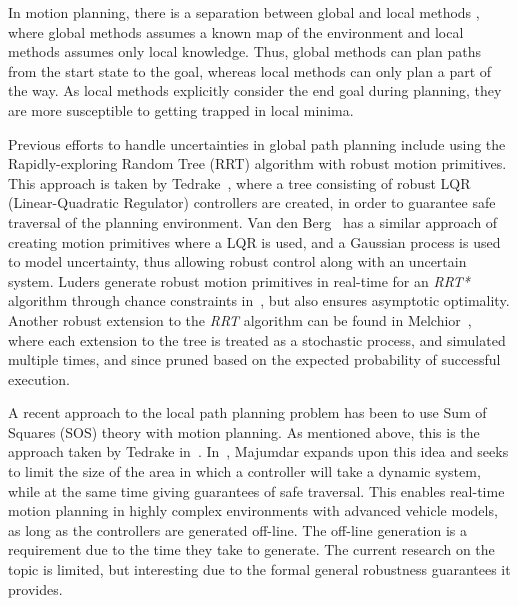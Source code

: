 
In motion planning, there is a separation between global and local methods
\cite{Hoy2015ClutteredEnvironmentSurvey}, where global methods assumes a known
map of the environment and local methods assumes only local knowledge. Thus,
global methods can plan paths from the start state to the goal, whereas local
methods can only plan a part of the way. As local methods explicitly consider
the end goal during planning, they are more susceptible to getting trapped in
local minima.

Previous efforts to handle uncertainties in global path planning include using
the Rapidly-exploring Random Tree (RRT) algorithm with robust motion primitives.
This approach is taken by Tedrake~\cite{tedrakeLQRtreesFeedbackMotion2009},
where a tree consisting of robust LQR (Linear-Quadratic Regulator) controllers
are created, in order to guarantee safe traversal of the planning environment.
Van den Berg~\cite{vandenbergLQGMPOptimizedPath2011} has a similar approach of
creating motion primitives where a LQR is used, and a Gaussian process is used
to model uncertainty, thus allowing robust control along with an uncertain
system. Luders generate robust motion primitives in real-time for an
\textit{RRT*} algorithm through chance constraints in~\cite{luders2013robust},
but also ensures asymptotic optimality. Another robust extension to the
\textit{RRT} algorithm can be found in Melchior~\cite{melchior2007particle},
where each extension to the tree is treated as a stochastic process, and
simulated multiple times, and since pruned based on the expected probability of
successful execution.



A recent approach to the local path planning problem has been to use Sum of
Squares (SOS) theory with motion planning. As mentioned above, this is the
approach taken by Tedrake in~\cite{tedrakeLQRtreesFeedbackMotion2009}.
In~\cite{majumdarFunnelLibrariesRealtime2017}, Majumdar expands upon this idea
and seeks to limit the size of the area in which a controller will take a
dynamic system, while at the same time giving guarantees of safe traversal. This
enables real-time motion planning in highly complex environments with advanced
vehicle models, as long as the controllers are generated off-line. The off-line
generation is a requirement due to the time they take to generate. The current
research on the topic is limited, but interesting due to the formal general
robustness guarantees it provides.

